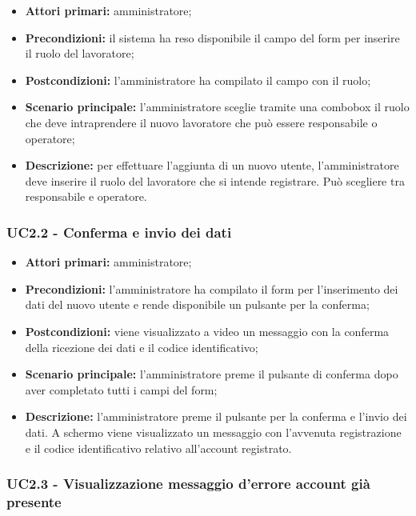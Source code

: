 \begin{itemize}
	\item 	\textbf{Attori primari:} amministratore;
	\item 	\textbf{Precondizioni:} il sistema ha reso disponibile il campo del form per inserire il ruolo del lavoratore;
	\item 	\textbf{Postcondizioni:} l’amministratore ha compilato il campo con il ruolo;
	\item 	\textbf{Scenario principale:} l’amministratore sceglie tramite una combobox il ruolo che deve intraprendere il nuovo lavoratore che può essere responsabile o operatore;
	\item 	\textbf{Descrizione:} per effettuare l’aggiunta di un nuovo utente, l’amministratore deve inserire il ruolo del lavoratore che si intende registrare. Può scegliere tra responsabile e operatore.
	
\end{itemize}


\subsubsection{UC2.2 - Conferma e invio dei dati}

\begin{itemize}
	\item 	\textbf{Attori primari:} amministratore;
	\item 	\textbf{Precondizioni:} l’amministratore ha compilato il form per l’inserimento dei dati del nuovo utente e rende disponibile un pulsante per la conferma;
	\item 	\textbf{Postcondizioni:} viene visualizzato a video un messaggio con la conferma della ricezione dei dati e il codice identificativo;
	\item 	\textbf{Scenario principale:} l’amministratore preme il pulsante di conferma dopo aver completato tutti i campi del form;
	\item 	\textbf{Descrizione:} l’amministratore preme il pulsante per la conferma e l’invio dei dati. A schermo viene visualizzato un messaggio con l’avvenuta registrazione e il codice identificativo relativo all’account registrato.

\end{itemize}

\subsubsection{UC2.3 - Visualizzazione messaggio d'errore account già presente}

